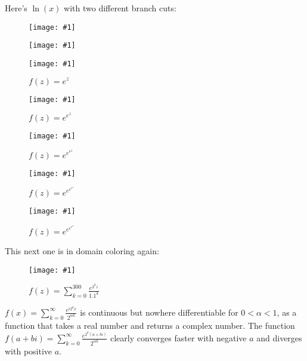 \documentclass[xhtml, mathjax]{article}
\newcommand{\singleimage}[2] {
  \begin{figure}
    \centering
    \texttt{[image: \#1]}\par
    #2
  \end{figure}
}
\begin{document}
    Here's $\ln(x)$ with two different branch cuts:

    \singleimage{log_1.gif}{}

    \singleimage{log_2.gif}{}

    \singleimage{exp.gif}{$f(z)=e^z$}

    \singleimage{exp_2.gif}{$f(z)=e^{e^z}$}

    \singleimage{exp_3.gif}{$f(z)=e^{e^{e^z}}$}

    \singleimage{exp_4.gif}{$f(z)=e^{e^{e^{e^z}}}$}

    \singleimage{exp_5.gif}{$f(z)=e^{e^{e^{e^{e^z}}}}$}

    This next one is in domain coloring again:

    \singleimage{sin_series.gif}{$f(z)=\sum_{k=0}^{300} \frac{e^{2^k
    z}}{1.1^k}$}

    $f(x) = \sum_{k=0}^\infty \frac{e^{i2^kx}}{2^{\alpha k}}$ is continuous but
    nowhere differentiable for $0 < \alpha < 1$, as a function that takes a real
    number and returns a complex number. The function $f(a+bi) =
    \sum_{k=0}^\infty \frac{e^{2^k(a+bi)}}{2^{\alpha k}}$ clearly converges
    faster with negative $a$ and diverges with positive $a$.

  
\end{document}
